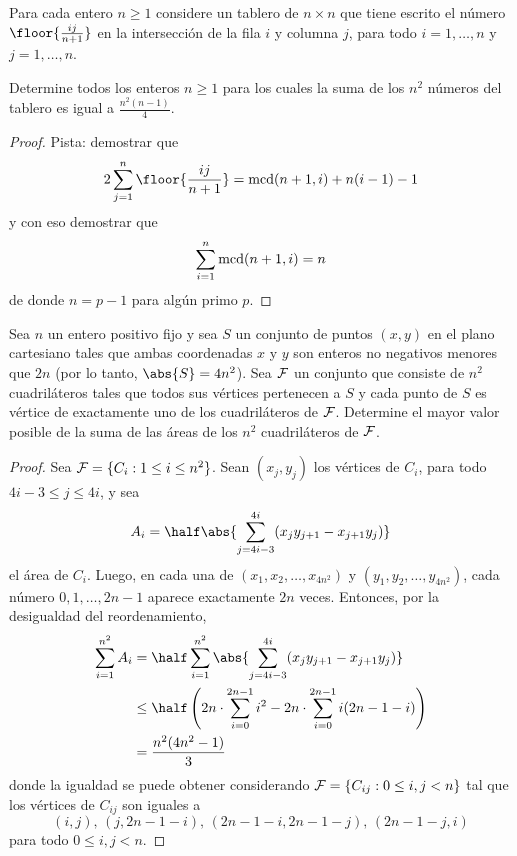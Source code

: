 \begin{probEG}
  Para cada entero $n\ge 1$ considere un tablero de $n\times n$ que tiene
  escrito el número $\floor{\frac{ij}{n+1}}$ en la intersección de la fila $i$ y
  columna $j$, para todo $i=1,\dots,n$ y $j=1,\dots,n$.

  Determine todos los enteros $n\ge 1$ para los cuales la suma de los $n^2$
  números del tablero es igual a $\frac{n^2(n-1)}{4}$.
\end{probEG}

\begin{proof}
  Pista: demostrar que
  \[2\sum_{j=1}^n\floor{\frac{ij}{n+1}}=\mcd(n+1,i)+n(i-1)-1\]
  y con eso demostrar que
  \[\sum_{i=1}^n\operatorname{mcd}(n+1,i)=n\]
  de donde $n=p-1$ para algún primo $p$.
\end{proof}

\begin{probMB}
  Sea $n$ un entero positivo fijo y sea $S$ un conjunto de puntos $(x,y)$ en el
  plano cartesiano tales que ambas coordenadas $x$ y $y$ son enteros no
  negativos menores que $2n$ (por lo tanto, $\abs{S}=4n^2$). Sea $\cal F$ un
  conjunto que consiste de $n^2$ cuadriláteros tales que todos sus vértices
  pertenecen a $S$ y cada punto de $S$ es vértice de exactamente uno de los
  cuadriláteros de $\cal F$. Determine el mayor valor posible de la suma de las
  áreas de los $n^2$ cuadriláteros de $\cal F$.
\end{probMB}

\begin{proof}
  Sea ${\cal F}=\{C_i:1\le i\le n^2\}$. Sean $(x_j,y_j)$ los vértices de $C_i$,
  para todo $4i-3\le j\le 4i$, y sea
  \[A_i=\half\abs{\sum_{j=4i-3}^{4i}(x_jy_{j+1}-x_{j+1}y_j)}\]
  el área de $C_i$. Luego, en cada una de $(x_1,x_2,\dots,x_{4n^2})$ y
  $(y_1,y_2,\dots,y_{4n^2})$, cada número $0,1,\dots,2n-1$ aparece exactamente
  $2n$ veces. Entonces, por la desigualdad del reordenamiento,
  \begin{align*}
    \sum_{i=1}^{n^2}A_i
    &= \half\sum_{i=1}^{n^2}\abs{\sum_{j=4i-3}^{4i}(x_jy_{j+1}-x_{j+1}y_j)} \\
    &\le \half\left(2n\cdot\sum_{i=0}^{2n-1}i^2-2n\cdot\sum_{i=0}^{2n-1}i(2n-1-i)\right) \\
    &= \frac{n^2(4n^2-1)}{3}
  \end{align*}
  donde la igualdad se puede obtener considerando
  ${\cal F}=\{C_{ij}:0\le i,j<n\}$ tal que los vértices de $C_{ij}$ son iguales
  a
  \[(i,j),\,(j,2n-1-i),\,(2n-1-i,2n-1-j),\,(2n-1-j,i)\]
  para todo $0\le i,j<n$.
\end{proof}

